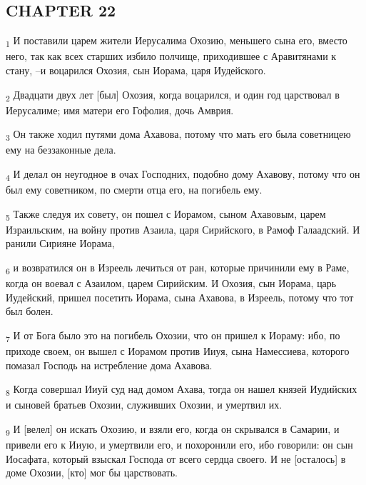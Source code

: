 \subsection{CHAPTER 22}
\begin{tcolorbox}
\textsubscript{1} И поставили царем жители Иерусалима Охозию, меньшего сына его, вместо него, так как всех старших избило полчище, приходившее с Аравитянами к стану, --и воцарился Охозия, сын Иорама, царя Иудейского.
\end{tcolorbox}
\begin{tcolorbox}
\textsubscript{2} Двадцати двух лет [был] Охозия, когда воцарился, и один год царствовал в Иерусалиме; имя матери его Гофолия, дочь Амврия.
\end{tcolorbox}
\begin{tcolorbox}
\textsubscript{3} Он также ходил путями дома Ахавова, потому что мать его была советницею ему на беззаконные дела.
\end{tcolorbox}
\begin{tcolorbox}
\textsubscript{4} И делал он неугодное в очах Господних, подобно дому Ахавову, потому что он был ему советником, по смерти отца его, на погибель ему.
\end{tcolorbox}
\begin{tcolorbox}
\textsubscript{5} Также следуя их совету, он пошел с Иорамом, сыном Ахавовым, царем Израильским, на войну против Азаила, царя Сирийского, в Рамоф Галаадский. И ранили Сирияне Иорама,
\end{tcolorbox}
\begin{tcolorbox}
\textsubscript{6} и возвратился он в Изреель лечиться от ран, которые причинили ему в Раме, когда он воевал с Азаилом, царем Сирийским. И Охозия, сын Иорама, царь Иудейский, пришел посетить Иорама, сына Ахавова, в Изреель, потому что тот был болен.
\end{tcolorbox}
\begin{tcolorbox}
\textsubscript{7} И от Бога было это на погибель Охозии, что он пришел к Иораму: ибо, по приходе своем, он вышел с Иорамом против Ииуя, сына Намессиева, которого помазал Господь на истребление дома Ахавова.
\end{tcolorbox}
\begin{tcolorbox}
\textsubscript{8} Когда совершал Ииуй суд над домом Ахава, тогда он нашел князей Иудийских и сыновей братьев Охозии, служивших Охозии, и умертвил их.
\end{tcolorbox}
\begin{tcolorbox}
\textsubscript{9} И [велел] он искать Охозию, и взяли его, когда он скрывался в Самарии, и привели его к Ииую, и умертвили его, и похоронили его, ибо говорили: он сын Иосафата, который взыскал Господа от всего сердца своего. И не [осталось] в доме Охозии, [кто] мог бы царствовать.
\end{tcolorbox}
